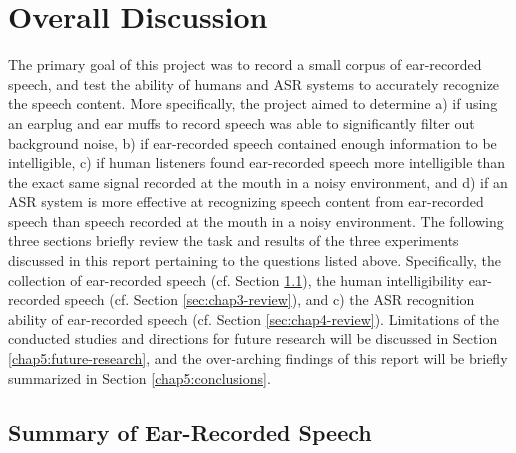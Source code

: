 % 
% 
% 

\chapter{Overall Discussion\label{chapter5}}


The primary goal of this project was to record a small corpus of ear-recorded speech, and test the ability of humans and ASR systems to accurately recognize the speech content.  More specifically, the project aimed to determine a) if using an earplug and ear muffs to record speech was able to significantly filter out background noise, b) if ear-recorded speech contained enough information to be intelligible, c) if human listeners found ear-recorded speech more intelligible than the exact same signal recorded at the mouth in a noisy environment, and d) if an ASR system is more effective at recognizing speech content from ear-recorded speech than speech recorded at the mouth in a noisy environment. The following three sections briefly review the task and results of the three experiments discussed in this report pertaining to the questions listed above. Specifically, the collection of ear-recorded speech (cf. Section \ref{sec:chap2-review}), the human intelligibility ear-recorded speech (cf. Section \ref{sec:chap3-review}), and c) the ASR recognition ability of ear-recorded speech (cf. Section \ref{sec:chap4-review}).  Limitations of the conducted studies and directions for future research will be discussed in Section \ref{chap5:future-research}, and the over-arching findings of this report will be briefly summarized in Section \ref{chap5:conclusions}.


\section{Summary of Ear-Recorded Speech}\label{sec:chap2-review}

